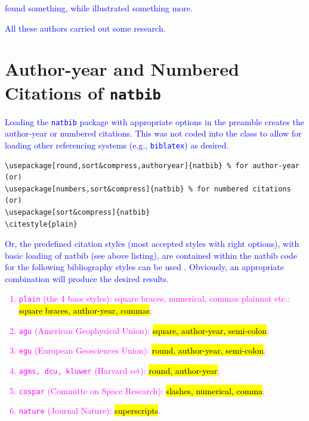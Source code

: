 \documentclass[phd,showgrids]{ndsu-thesis-2022}
\newcommand\italk[1]{\textcolor{blue}{#1}}  %
\begin{document}
\italk{\citet{calvo2004using} found something, while \citet{bari2016identification} illustrated something more. }

\italk{All these authors \citep{calvo2004using,cannayen2011latex,bari2016identification,sharma2012ndsu,baczkowski1990ndsu} carried out some research.} 

\section{Author-year and Numbered Citations of \texttt{natbib}}
\italk{Loading the \texttt{natbib} package with appropriate options in the preamble creates the author-year or numbered citations. This was not coded into the class to allow for loading other referencing systems (e.g., \texttt{biblatex}) as desired.}

{\singlespacing
\begin{verbatim}
\usepackage[round,sort&compress,authoryear]{natbib} % for author-year
(or)
\usepackage[numbers,sort&compress]{natbib} % for numbered citations
(or)
\usepackage[sort&compress]{natbib} 
\citestyle{plain}
\end{verbatim}
}

\italk{Or, the predefined citation styles (most accepted styles with right options), with basic loading of natbib (see above listing), are contained within the natbib code for the following bibliography styles can be used \citep{daly2010natural}. Obviously, an appropriate combination will produce the desired results.\\}

\vspace{-6ex}
\textcolor{magenta}{
\begin{enumerate}
\item \texttt{plain} (the 4 base styles): square braces, numerical, commas plainnat etc.: \hl{square braces, author-year, commas};
\item \texttt{agu} (American Geophysical Union): \hl{square, author-year, semi-colon};
\item \texttt{egu} (European Geosciences Union): \hl{round, author-year, semi-colon};
\item \texttt{agms, dcu, kluwer} (Harvard set): \hl{round, author-year};
\item \texttt{cospar} (Committe on Space Research): \hl{slashes, numerical, comma};
\item \texttt{nature} (Journal Nature): \hl{superscripts}.
\end{enumerate}
}
\end{document}
